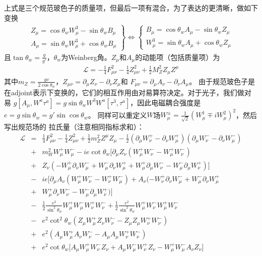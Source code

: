 上式是三个规范玻色子的质量项，但最后一项有混合，为了表达的更清晰，做如下变换
\begin{eqnarray}
\left.\begin{array}{c}Z_{\mu} = \cos\theta_w W^3_{\mu}-\sin\theta_wB_{\mu} \\ 
A_{\mu} = \sin\theta_w W^3_{\mu} + \cos\theta_w B_{\mu} \end{array} \right\} 
\Leftrightarrow
\left\{ \begin{array}{c} 
B_{\mu} = \cos\theta_w A_{\mu} -\sin\theta_w Z_{\mu} \\
W^3_{\mu} = \sin\theta_w A_{\mu} + \cos\theta_w Z_{\mu}
\end{array} \right.
\end{eqnarray}
且$\tan\theta_w = \frac{g}{g'}$，$\theta_w$为Weinberg角。$Z_{\mu}$和$A_{\mu}$的动能项（包括质量项）为
\begin{eqnarray}
\mathscr{L} = -\frac{1}{4}F^2_{\mu\nu} - \frac{1}{4}Z^2_{\mu\nu} + \frac{1}{2} M^2_Z Z_{\mu} Z^{\mu}
\end{eqnarray}
其中$m_Z = \frac{gv}{2\cos\theta_w}$，$Z_{\mu\nu} = \partial_{\mu}Z_{\nu} - \partial_{\nu}Z_{\mu}$和
$F_{\mu\nu} = \partial_{\mu}A_{\nu} - \partial_{\nu}A_{\mu}$。
由于规范玻色子是在adjoint表示下变换的，它们的相互作用由对易算符决定。对于光子，我们做对易
$g[A_{\mu}, W^a\tau^a] =  g\sin\theta_w W^3W^a[\tau^3,\tau^a]$，因此电磁耦合强度是
$e = g\sin\theta_w = g'\sin\cos\theta_w$。
同样可以重定义$W$场$W^{\pm}_{\mu} = \frac{1}{\sqrt 2}(W^1_{\mu}\mp iW^2_{\mu})^2$，然后写出规范场的
拉氏量（注意相同指标求和）：
\begin{eqnarray}
\mathscr{L} &=& \frac{1}{4}F^2_{\mu\nu} -\frac{1}{4}Z^2_{\mu\nu} + \frac{1}{2}m^2_Z Z^{\mu}Z_{\mu}
-\frac{1}{2}(\partial_{\mu}W^+_{\nu} - \partial_{\nu}W^+_{\mu})(\partial_{\mu}W^-_{\nu}-\partial_{\nu}
W^-_{\mu})  \nonumber \\
&+& m^2_W W^+_{\mu}W^-_{\mu} - ie \cot\theta_w\Big[\partial_{\mu}Z_{\nu}(W^+_{\mu}W^-_{\nu} - 
W^+_{\mu}W^-_{\nu})  \nonumber \\
&+& Z_{\nu}(-W^+_{\mu}\partial_{\nu}W^-_{\mu} + W^-_{\mu}\partial_{\nu}W^+_{\mu} + 
W^+_{\mu}\partial_{\mu}W^-_{\nu} - W^-_{\mu}\partial_{\mu}W^+_{\nu}) \Big]
\nonumber \\
&-& ie\Big[ \partial_{\mu}A_{\nu}(W^+_{\mu}W^-_{\nu} -  W^+_{\nu}W^-_{\mu}) + 
A_{\nu}(-W^+_{\nu}\partial_{\nu}W^-_{\mu} + W^-_{\mu}\partial_{\nu}W^+_{\mu} 
\nonumber \\
&+& W^+_{\mu}\partial_{\nu}W^-_{\nu} - W^-_{\mu}\partial_{\mu}W^+_{\nu}) \Big]
\nonumber \\
&-& \frac{1}{2}\frac{e^2}{\sin^2\theta_w}W^+_{\mu}W^-_{\mu}W^+_{\nu}W^-_{\nu}
+ \frac{1}{2}\frac{e^2}{\sin^2\theta_w}W^+_{\mu}W^-_{\nu}W^+_{\mu}W^-_{\nu}
\nonumber \\
&-& e^2\cot^2\theta_w(Z_{\mu}W^+_{\mu}Z_{\nu}W^-_{\nu} - Z_{\mu}Z_{\mu}W^+_{\nu}W^-_{\nu})
\nonumber \\
&+& e^2(A_{\mu}W^+_{\mu}A_{\nu}W^-_{\nu} - A_{\mu}A_{\mu}W^+_{\nu}W^-_{\nu})
\nonumber \\
&+& e^2\cot\theta_w\Big[A_{\mu}W^+_{\mu}W^-_{\nu}Z_{\nu} + A_{\mu}W^-_{\mu}W^+_{\nu}Z_{\nu} 
- W^+_{\mu}W^-_{\mu}A_{\nu}Z_{\nu}\Big]
\end{eqnarray}
